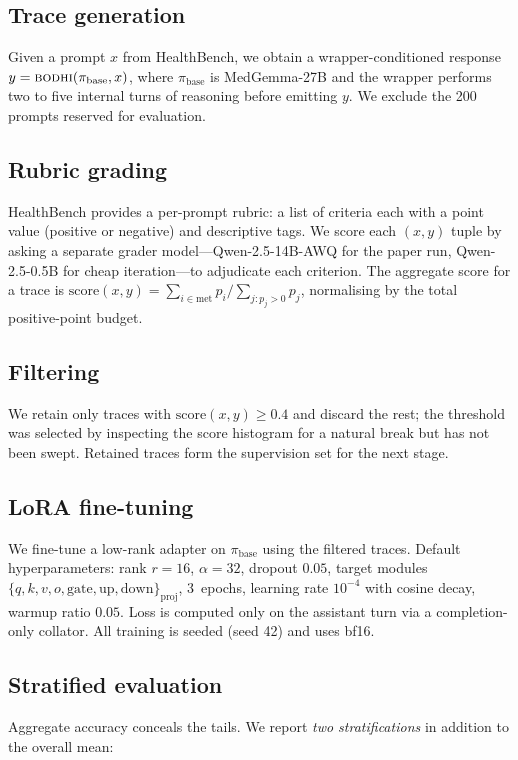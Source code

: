 \documentclass[10pt,letterpaper]{article}
\begin{document}
\subsection{Trace generation}
Given a prompt $x$ from HealthBench, we obtain a wrapper-conditioned
response $y = \textsc{bodhi}(\pi_\text{base}, x)$, where
$\pi_\text{base}$ is MedGemma-27B and the wrapper performs two to five
internal turns of reasoning before emitting $y$. We exclude the 200
prompts reserved for evaluation.

\subsection{Rubric grading}
HealthBench provides a per-prompt rubric: a list of criteria each with a
point value (positive or negative) and descriptive tags. We score each
$(x, y)$ tuple by asking a separate grader model---Qwen-2.5-14B-AWQ for
the paper run, Qwen-2.5-0.5B for cheap iteration---to adjudicate each
criterion. The aggregate score for a trace
is $\text{score}(x, y) = \sum_{i \in \text{met}} p_i / \sum_{j: p_j > 0} p_j$,
normalising by the total positive-point budget.

\subsection{Filtering}
We retain only traces with $\text{score}(x, y) \ge 0.4$ and discard
the rest; the threshold was selected by inspecting the score
histogram for a natural break but has not been swept. Retained
traces form the supervision set for the next stage.

\subsection{LoRA fine-tuning}
We fine-tune a low-rank adapter on $\pi_\text{base}$ using the filtered
traces. Default hyperparameters: rank $r{=}16$, $\alpha{=}32$,
dropout $0.05$, target modules
$\{q,k,v,o,\text{gate},\text{up},\text{down}\}_\text{proj}$,
3~epochs, learning rate $10^{-4}$ with cosine decay, warmup ratio $0.05$.
Loss is computed only on the assistant turn via a completion-only
collator. All training is seeded (seed 42) and uses bf16.

\subsection{Stratified evaluation}
\label{sec:eval}
Aggregate accuracy conceals the tails. We report \emph{two
stratifications} in addition to the overall mean:
\end{document}
